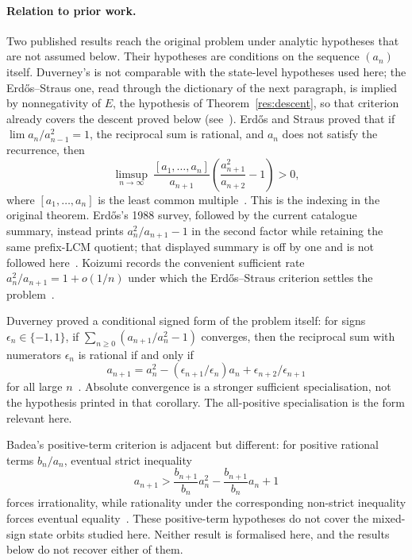\documentclass[11pt]{article}
\begin{document}
\paragraph{Relation to prior work.}
Two published results reach the original problem under analytic hypotheses that
are not assumed below.  Their hypotheses are conditions on the sequence $(a_n)$
itself.  Duverney's is not comparable with the state-level hypotheses used
here; the Erd\H{o}s--Straus one, read through the dictionary of the next
paragraph, is implied by nonnegativity of $E$, the hypothesis of
Theorem~\ref{res:descent}, so that criterion already covers the descent proved
below (see~\cite[Cor.~20(1) and Prop.~19(1), pp.~12--13]{koizumi2025}).
Erd\H{o}s and Straus proved that if $\lim a_n/a_{n-1}^{2}=1$, the reciprocal
sum is rational, and $a_n$ does not satisfy the recurrence, then
\[
 \limsup_{n\to\infty}\ \frac{[a_1,\ldots,a_n]}{a_{n+1}}
 \left(\frac{a_{n+1}^{2}}{a_{n+2}}-1\right)>0,
\]
where $[a_1,\ldots,a_n]$ is the least common
multiple~\cite[Theorem~3, p.~132]{erdosstraus1964}.  This is the indexing in
the original theorem.  Erd\H{o}s's 1988 survey, followed by the current
catalogue summary, instead prints $a_n^2/a_{n+1}-1$ in the second factor while
retaining the same prefix-LCM quotient; that displayed summary is off by one
and is not followed here~\cite[p.~105]{erdos1988}\cite{erdosproblems}.
Koizumi records the convenient sufficient rate
$a_n^2/a_{n+1}=1+o(1/n)$ under which the Erd\H{o}s--Straus criterion settles
the problem~\cite[Remark~21, p.~13]{koizumi2025}.

Duverney proved a
conditional signed form of the problem itself: for signs
$\epsilon_n\in\{-1,1\}$, if
$\sum_{n\ge0}(a_{n+1}/a_n^{2}-1)$ converges, then the reciprocal sum with
numerators $\epsilon_n$ is rational if and only if
\[
 a_{n+1}=a_n^2-(\epsilon_{n+1}/\epsilon_n)a_n
             +\epsilon_{n+2}/\epsilon_{n+1}
\]
for all large $n$~\cite[Corollary~3.2, p.~287]{duverney2001}.  Absolute
convergence is a stronger sufficient specialisation, not the hypothesis
printed in that corollary.  The all-positive specialisation is the form
relevant here.

Badea's positive-term criterion is adjacent but different:
for positive rational terms $b_n/a_n$, eventual strict inequality
\[
 a_{n+1}>\frac{b_{n+1}}{b_n}a_n^2-\frac{b_{n+1}}{b_n}a_n+1
\]
forces irrationality, while rationality under the corresponding non-strict
inequality forces eventual equality~\cite[Theorem~A, p.~313; Cor.~2.2,
p.~316]{badea1993}.  These positive-term hypotheses do not cover the
mixed-sign state orbits studied here.  Neither result is formalised here, and
the results below do not recover either of them.
\end{document}
